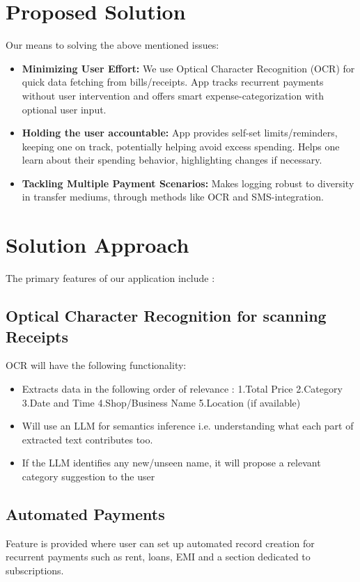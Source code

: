 \documentclass[11pt,a4paper]{article}
\begin{document}
\section{Proposed Solution %
}
Our means to solving the above mentioned issues:
\begin{itemize}[leftmargin=0.7cm]
    \item \textbf{Minimizing User Effort:} We use Optical Character Recognition (OCR) for quick data fetching from bills/receipts. App tracks recurrent payments without user intervention and offers smart expense-categorization with optional user input.
    \item \textbf{Holding the user accountable:} App provides self-set limits/reminders, keeping one on track, potentially helping avoid excess spending. Helps one learn about their spending behavior, highlighting changes if necessary.
    \item \textbf{Tackling Multiple Payment Scenarios:} Makes logging robust to diversity in transfer mediums, through methods like OCR and SMS-integration.
\end{itemize}




\section{Solution Approach %
}
The primary features of our application include : 
\subsection{Optical Character Recognition for scanning Receipts %
}
OCR will have the following functionality:
\begin{itemize}[leftmargin=0.7cm]
    \item Extracts data in the following order of relevance : 1.Total Price 2.Category  3.Date and Time 4.Shop/Business Name    5.Location (if available)
    \item Will use an LLM for semantics inference i.e. understanding what each part of extracted text contributes too.
    \item If the LLM identifies any new/unseen name, it will propose a relevant category suggestion to the user 
\end{itemize}

\subsection{Automated Payments %
}
Feature is provided where user can set up automated record creation for recurrent payments such as rent, loans, EMI and a section dedicated to subscriptions.
\end{document}
